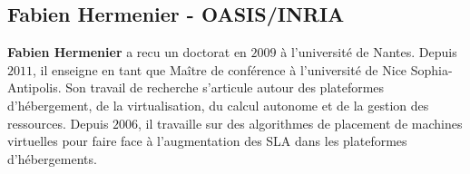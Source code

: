 \documentclass[a4paper]{article}
\begin{document}
\subsection{Fabien Hermenier - OASIS/INRIA}
\textbf{Fabien Hermenier} a recu un doctorat en $2009$ à l'université
de Nantes. Depuis $2011$, il enseigne en tant que Maître de conférence
à l'université de Nice Sophia-Antipolis. Son travail de recherche
s'articule autour des plateformes d'hébergement, de la virtualisation,
du calcul autonome et de la gestion des ressources. Depuis $2006$, il
travaille sur des algorithmes de placement de machines virtuelles pour
faire face à l'augmentation des SLA dans les plateformes d'hébergements.

\newpage
{}


\end{document}
